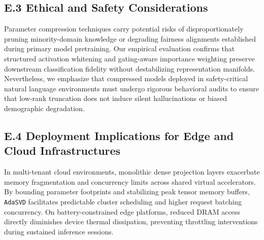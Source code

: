 \documentclass{article}
\begin{document}
\subsection*{E.3 Ethical and Safety Considerations}
Parameter compression techniques carry potential risks of disproportionately pruning minority-domain knowledge or degrading fairness alignments established during primary model pretraining. Our empirical evaluation confirms that structured activation whitening and gating-aware importance weighting preserve downstream classification fidelity without destabilizing representation manifolds. Nevertheless, we emphasize that compressed models deployed in safety-critical natural language environments must undergo rigorous behavioral audits to ensure that low-rank truncation does not induce silent hallucinations or biased demographic degradation.

\subsection*{E.4 Deployment Implications for Edge and Cloud Infrastructures}
In multi-tenant cloud environments, monolithic dense projection layers exacerbate memory fragmentation and concurrency limits across shared virtual accelerators. By bounding parameter footprints and stabilizing peak tensor memory buffers, \texttt{AdaSVD} facilitates predictable cluster scheduling and higher request batching concurrency. On battery-constrained edge platforms, reduced DRAM access directly diminishes device thermal dissipation, preventing throttling interventions during sustained inference sessions.
\end{document}
